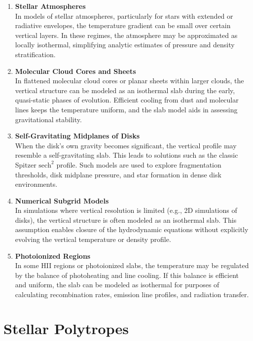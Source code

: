 \begin{enumerate}
    \item \textbf{Stellar Atmospheres} \\
    In models of stellar atmospheres, particularly for stars with extended or radiative envelopes, the temperature gradient can be small over certain vertical layers. In these regimes, the atmosphere may be approximated as locally isothermal, simplifying analytic estimates of pressure and density stratification.

    \item \textbf{Molecular Cloud Cores and Sheets} \\
    In flattened molecular cloud cores or planar sheets within larger clouds, the vertical structure can be modeled as an isothermal slab during the early, quasi-static phases of evolution. Efficient cooling from dust and molecular lines keeps the temperature uniform, and the slab model aids in assessing gravitational stability.

    \item \textbf{Self-Gravitating Midplanes of Disks} \\
    When the disk’s own gravity becomes significant, the vertical profile may resemble a self-gravitating slab. This leads to solutions such as the classic Spitzer $\mathrm{sech}^2$ profile. Such models are used to explore fragmentation thresholds, disk midplane pressure, and star formation in dense disk environments.

    \item \textbf{Numerical Subgrid Models} \\
    In simulations where vertical resolution is limited (e.g., 2D simulations of disks), the vertical structure is often modeled as an isothermal slab. This assumption enables closure of the hydrodynamic equations without explicitly evolving the vertical temperature or density profile.

    \item \textbf{Photoionized Regions} \\
    In some HII regions or photoionized slabs, the temperature may be regulated by the balance of photoheating and line cooling. If this balance is efficient and uniform, the slab can be modeled as isothermal for purposes of calculating recombination rates, emission line profiles, and radiation transfer.
\end{enumerate}

\section{Stellar Polytropes}

